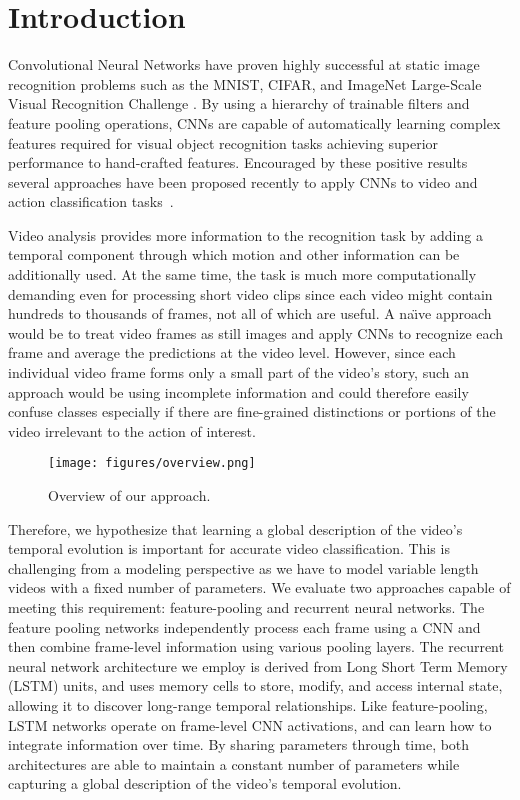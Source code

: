 \documentclass[10pt,twocolumn,letterpaper]{article}
\begin{document}
 \section{Introduction}
\label{sec:intro}

Convolutional Neural Networks have proven highly successful at static
image recognition problems such as the MNIST, CIFAR, and ImageNet
Large-Scale Visual Recognition Challenge \cite{krizhevsky2012imagenet,
  szegedy14going, zeiler13visualizing}. By using a hierarchy of trainable filters
and feature pooling operations, CNNs are capable of automatically learning
complex features required for visual object recognition tasks
achieving superior performance to hand-crafted features. Encouraged by these positive results
several approaches have been proposed recently to apply CNNs to video and action
classification tasks~\cite{liris2011,ji2013,karpathy2014large,simonyan2014two}.


Video analysis provides more information to the recognition task by
adding a temporal component through which motion and other information
can be additionally used. At the same time, the task is much more
computationally demanding even for processing short video clips since
each video might contain hundreds to thousands of frames, not all of
which are useful. A na\"{\i}ve approach would be to treat video frames
as still images and apply CNNs to recognize each frame and average the predictions at the video level. However, since each individual
video frame forms only a small part of the video's story, such an
approach would be using incomplete information and could therefore
easily confuse classes especially if there are fine-grained
distinctions or portions of the video irrelevant to the action of
interest.

\begin{figure}
\begin{center}
  \texttt{[image: figures/overview.png]}
  \caption{Overview of our approach.}
\end{center}
\end{figure}

Therefore, we hypothesize that learning a global description of the
video's temporal evolution is important for accurate video
classification. This is challenging from a modeling perspective as we
have to model variable length videos with a fixed number of
parameters.  We evaluate two approaches capable of meeting this
requirement: feature-pooling and recurrent neural networks. The
feature pooling networks independently process each frame using a CNN
and then combine frame-level information using various pooling
layers. The recurrent neural network architecture we employ is derived
from Long Short Term Memory (LSTM) \cite{hochreiter97long} units, and
uses memory cells to store, modify, and access internal state,
allowing it to discover long-range temporal relationships. Like
feature-pooling, LSTM networks operate on frame-level CNN activations,
and can learn how to integrate information over time. By sharing
parameters through time, both architectures are able to maintain a
constant number of parameters while capturing a global description of
the video's temporal evolution.
\end{document}

